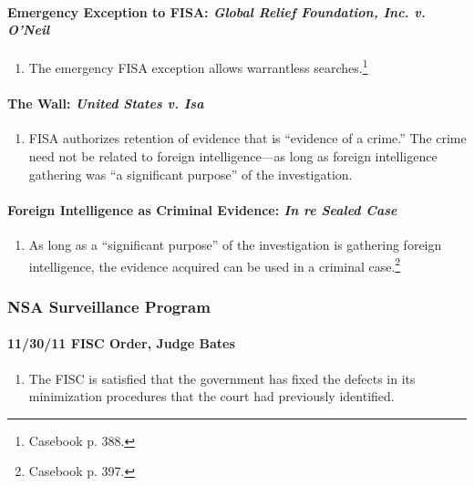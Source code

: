 \paragraph{Emergency Exception to FISA: \emph{Global Relief Foundation, Inc. 
v. O'Neil}}

\begin{enumerate}
    \item The emergency FISA exception allows warrantless 
    searches.\footnote{Casebook p. 388.}
\end{enumerate}

\paragraph{The Wall: \emph{United States v. Isa}}

\begin{enumerate}
    \item FISA authorizes retention of evidence that is ``evidence of a 
    crime.'' The crime need not be related to foreign intelligence---as long 
    as foreign intelligence gathering was ``a significant purpose'' of the 
    investigation.
\end{enumerate}

\paragraph{Foreign Intelligence as Criminal Evidence: \emph{In re Sealed 
Case}}

\begin{enumerate}
    \item As long as a ``significant purpose'' of the investigation is 
    gathering foreign intelligence, the evidence acquired can be used in a 
    criminal case.\footnote{Casebook p. 397.}
\end{enumerate}

\subsubsection{NSA Surveillance Program}

\paragraph{11/30/11 FISC Order, Judge Bates}

\begin{enumerate}
    \item The FISC is satisfied that the government has fixed the defects in 
    its minimization procedures that the court had previously identified.
\end{enumerate}

